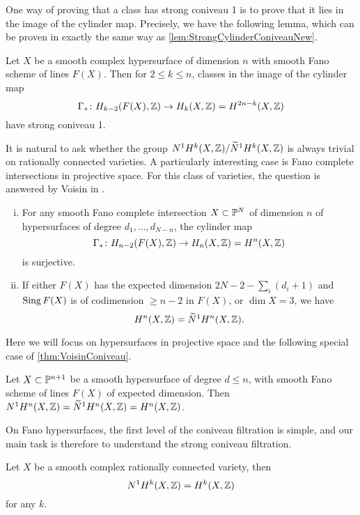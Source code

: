 One way of proving that a class has strong coniveau 1 is to prove that it lies in the image of the cylinder map. Precisely, we have the following lemma, which can be proven in exactly the same way as \cref{lem:StrongCylinderConiveauNew}.
\begin{lemma}
	\label{lem:ImageStrongConiveau}
	Let $X$ be a smooth complex hypersurface of dimension $n$ with smooth Fano scheme of lines $F(X)$. Then for $2 \leq k \leq n$, classes in the image of the cylinder map 
	\[\Gamma_* \from H_{k-2}(F(X),\Z) \to H_k(X,\Z) = H^{2n-k}(X,\Z)\]
	have strong coniveau 1.
\end{lemma}
	
It is natural to ask whether the group $N^1H^k(X,\Z) / \widetilde{N}^1H^k(X,\Z)$ is always trivial on rationally connected varieties. A particularly interesting case is Fano complete intersections in projective space. For this class of varieties, the question is answered by Voisin in \cite[Theorem 1.13]{VoisinConiveauThreefolds}.
\begin{theorem}
\label{thm:VoisinConiveau}
\leavevmode
  \begin{enumerate}[i)]
\item   For any smooth Fano complete intersection  $X \subset \P^N$ of dimension $n$ of hypersurfaces of degree $d_1,\dots,d_{N-n}$, the cylinder map 
\[\Gamma_* \from H_{n-2}(F(X),\Z) \to H_n(X,\Z) = H^n(X,\Z) \]
is surjective.
\setcounter{enumi}{2}
\item If either $F(X)$ has the expected dimension $2N - 2 - \sum_{i}(d_i+1)$ and $\Sing F(X)$ is of codimension $\geq n-2$ in $F(X)$, or $\dim X = 3$, we have
\[H^n(X,\Z) = \widetilde{N}^1H^n(X,\Z).\]
  \end{enumerate}
\end{theorem}
Here we will focus on hypersurfaces in projective space and the following special case of \cref{thm:VoisinConiveau}.
\begin{theorem}
  \label{thm:VoisinOnHypersurfaces}
  Let $X \subset \P^{n+1}$ be a smooth hypersurface of degree $d \leq n$, with smooth Fano scheme of lines $F(X)$ of expected dimension. Then $N^1H^n(X,\Z) = \widetilde{N}^1H^n(X,\Z) = H^n(X,\Z)$.
\end{theorem}

On Fano hypersurfaces, the first level of the coniveau filtration is simple, and our main task is therefore to understand the strong coniveau filtration.
\begin{proposition}
\label{lem:VoisinRegularConiveauHypersurface}
  Let $X$ be a smooth complex rationally connected variety, then 
\[N^1H^k(X,\Z) = H^k(X,\Z) \]
for any $k$.
\end{proposition}

